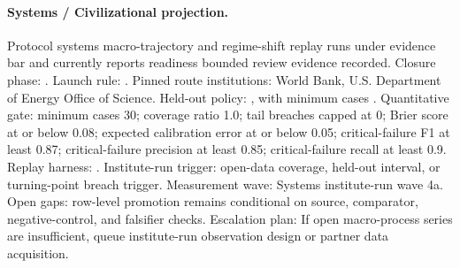 \paragraph{Systems / Civilizational projection.}
Protocol systems macro-trajectory and regime-shift replay runs under evidence bar  and currently reports readiness bounded review evidence recorded.
Closure phase: . Launch rule: .
Pinned route institutions: World Bank, \allowbreak U.S. Department of Energy Office of Science.
Held-out policy: , with minimum cases .
Quantitative gate: minimum cases 30; coverage ratio 1.0; tail breaches capped at 0; Brier score at or below 0.08; expected calibration error at or below 0.05; critical-failure F1 at least 0.87; critical-failure precision at least 0.85; critical-failure recall at least 0.9.
Replay harness: .
Institute-run trigger: open-data coverage, held-out interval, or turning-point breach trigger. Measurement wave: Systems institute-run wave 4a.
Open gaps: row-level promotion remains conditional on source, comparator, negative-control, and falsifier checks.
Escalation plan: If open macro-process series are insufficient, queue institute-run observation design or partner data acquisition.
